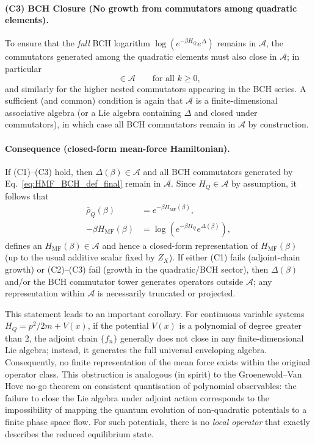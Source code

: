 \paragraph{(C3) BCH Closure (No growth from commutators among quadratic elements).}
To ensure that the \emph{full} BCH logarithm $\log(e^{-\beta H_Q}e^{\Delta})$ remains in $\mathcal A$,
the commutators generated among the quadratic elements must also close in $\mathcal A$; in particular
\begin{equation}
    [\Delta(\beta),\,\mathrm{ad}_{H_Q}^k\Delta(\beta)]\in\mathcal A\qquad \text{for all $k\ge 0$,}
    \label{eq:C3_BCH_closure}
\end{equation}
and similarly for the higher nested commutators appearing in the BCH series.
A sufficient (and common) condition is again that $\mathcal A$ is a finite-dimensional associative algebra
(or a Lie algebra containing $\Delta$ and closed under commutators), in which case all BCH commutators remain
in $\mathcal A$ by construction.

\paragraph{Consequence (closed-form mean-force Hamiltonian).}
If (C1)--(C3) hold, then $\Delta(\beta)\in\mathcal A$ and all BCH commutators generated by
Eq.~\eqref{eq:HMF_BCH_def_final} remain in $\mathcal A$. Since $H_Q\in\mathcal A$ by assumption, it follows that
\begin{equation}
    \label{eq:HMF_BCH_def_final}
    \begin{split}
        \bar\rho_Q(\beta)             & = e^{-\beta H_{\mathrm{MF}}(\beta)},                  \\
        -\beta H_{\mathrm{MF}}(\beta) & = \log\!\left(e^{-\beta H_Q}e^{\Delta(\beta)}\right),
    \end{split}
\end{equation}
defines an $H_{\mathrm{MF}}(\beta)\in\mathcal A$ and hence a closed-form representation of
$H_{\mathrm{MF}}(\beta)$ (up to the usual additive scalar fixed by $Z_X$). If either (C1) fails (adjoint-chain growth) or (C2)--(C3) fail (growth in the quadratic/BCH sector),
then $\Delta(\beta)$ and/or the BCH commutator tower generates operators outside $\mathcal A$; any representation within $\mathcal A$ is necessarily truncated or projected.

This statement leads to an important corollary. For continuous variable systems $H_Q = p^2/2m + V(x)$, if the potential $V(x)$ is a polynomial of degree greater than 2, the adjoint chain $\{f_n\}$ generally does not close in any finite-dimensional Lie algebra; instead, it generates the full universal enveloping algebra. Consequently, no finite representation of the mean force exists within the original operator class. This obstruction is analogous (in spirit) to the Groenewold--Van Hove no-go theorem on consistent quantisation of polynomial observables: the failure to close the Lie algebra under adjoint action corresponds to the impossibility of mapping the quantum evolution of non-quadratic potentials to a finite phase space flow. For such potentials, there is no \emph{local operator} that exactly describes the reduced equilibrium state.

